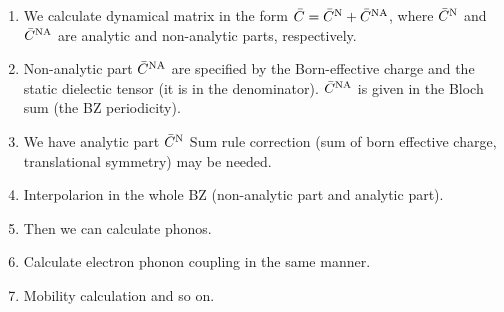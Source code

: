 \documentclass[a4paper,10pt,fleqn]{article}
\begin{document}
\begin{enumerate}
 \item
 We calculate dynamical matrix in the form
 $\bar{C}=\bar{C}^{\rm N} +\bar{C}^{\rm NA}$,
 where $\bar{C}^{\rm N}$ and $\bar{C}^{\rm NA}$ are analytic and non-analytic parts,
 respectively.
 \item
  Non-analytic part $\bar{C}^{\rm NA}$ are specified by the Born-effective charge
  and the static dielectic tensor (it is in the denominator).
  $\bar{C}^{\rm NA}$ is given in the Bloch sum (the BZ periodicity).

 \item
   We have analytic part 
   $\bar{C}^{\rm N}$
     Sum rule correction (sum of born effective charge, translational
       symmetry) may be needed.
  \item
     Interpolarion in the whole BZ (non-analytic part and analytic part).
  \item
     Then we can calculate phonos.
  \item
     Calculate electron phonon coupling in the same manner.
  \item
     Mobility calculation and so on.
\end{enumerate}

\newpage
\end{document}
